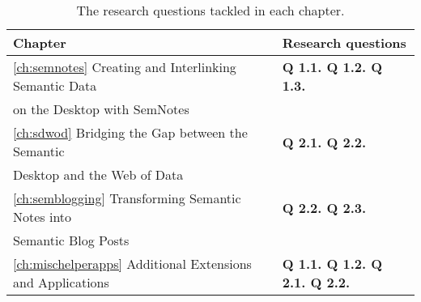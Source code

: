 \begin{table}
\centering
{}
\begin{tabular}{@{}lc@{\hs}l@{\hs}}
\toprule
Chapter & \phantom{a} & Research questions\\ 
\midrule

 \ref{ch:semnotes} Creating and Interlinking Semantic Data && \textbf{Q 1.1. Q 1.2. Q 1.3.}  \\ 

 \hfill on the Desktop with SemNotes && \\

 \ref{ch:sdwod} Bridging the Gap between the Semantic && \textbf{Q 2.1. Q 2.2.} \\

 \hfill Desktop and the Web of Data && \\

 \ref{ch:semblogging} Transforming Semantic Notes into && \textbf{Q 2.2. Q 2.3.} \\
 
 \hfill Semantic Blog Posts && \\

 \ref{ch:mischelperapps} Additional Extensions and Applications && \textbf{Q 1.1. Q 1.2. Q 2.1. Q 2.2.} \\

\bottomrule
\end{tabular}
\caption{The research questions tackled in each chapter.}
\label{tab:chaptersquestions}
\end{table}